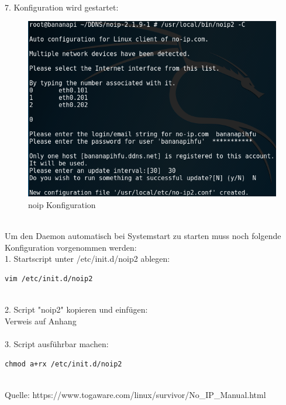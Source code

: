 ~\\
7. Konfiguration wird gestartet:
\begin{figure}[ht]
\includegraphics[width=\textwidth]{pictures/Jonas/noip_Konfiguration}
\caption{noip Konfiguration}
\end{figure}

~\\
Um den Daemon automatisch bei Systemstart zu starten muss noch folgende Konfiguration vorgenommen werden:\\
1. Startscript unter /etc/init.d/noip2 ablegen:
\begin{lstlisting}
vim /etc/init.d/noip2
\end{lstlisting}
~\\
2. Script "noip2" kopieren und einfügen:\\
Verweis auf Anhang\\
~\\
3. Script ausführbar machen:
\begin{lstlisting}
chmod a+rx /etc/init.d/noip2
\end{lstlisting}
~\\ Quelle: https://www.togaware.com/linux/survivor/No\_IP\_Manual.html \cite{noip}
\newpage

